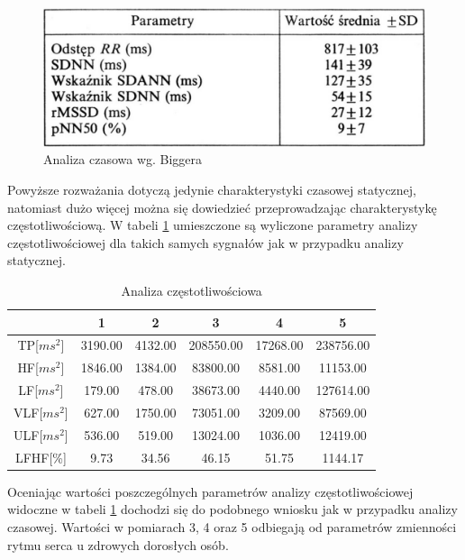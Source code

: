 \vspace{5mm}

\begin{figure}[ht]
\centering
\includegraphics[scale=0.4]{HRV1/foty/bigger.jpg}
\caption{Analiza czasowa wg. Biggera}
\label{fig:big}
\end{figure}
\newpage
Powyższe rozważania dotyczą jedynie charakterystyki czasowej statycznej, natomiast dużo więcej można się dowiedzieć przeprowadzając charakterystykę częstotliwościową. W tabeli \ref{tab:freq} umieszczone są wyliczone parametry analizy częstotliwościowej dla takich samych sygnałów jak w przypadku analizy statycznej.



\begin{table}[ht]
\caption{Analiza częstotliwościowa}
\label{tab:freq}
\begin{tabular}{|c|c|c|c|c|c|}
 \hline
 & 1 & 2 & 3 & 4 & 5\\
\hline
TP[$ms^{2}$] & 3190.00 & 4132.00 & 208550.00 & 17268.00 & 238756.00\\
HF[$ms^{2}$] & 1846.00 & 1384.00 & 83800.00 & 8581.00 & 11153.00\\
LF[$ms^{2}$] & 179.00 & 478.00 & 38673.00 & 4440.00 & 127614.00\\
VLF[$ms^{2}$] & 627.00 & 1750.00 & 73051.00 & 3209.00 & 87569.00\\
ULF[$ms^{2}$] & 536.00 & 519.00 & 13024.00 & 1036.00 & 12419.00\\
LFHF[\%] & 9.73 & 34.56 & 46.15 & 51.75 & 1144.17\\
\hline
\end{tabular}
\end{table}



Oceniając wartości poszczególnych parametrów analizy częstotliwościowej widoczne w tabeli \ref{tab:freq} dochodzi się do podobnego wniosku jak w przypadku analizy czasowej. Wartości w pomiarach 3, 4 oraz 5 odbiegają od parametrów zmienności rytmu serca u zdrowych dorosłych osób.


